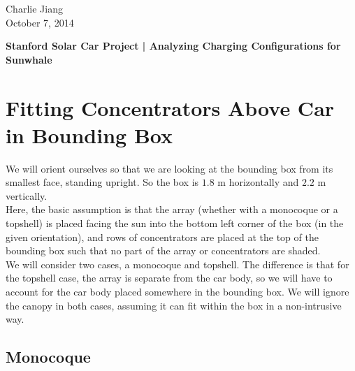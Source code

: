 \documentclass[reqno, 11pt, final]{article}
\begin{document}
\begin{flushright}
Charlie Jiang \\
October 7, 2014
\\[12pt]
\end{flushright}

\textbf{Stanford Solar Car Project | Analyzing Charging Configurations for Sunwhale} \\
\renewcommand{\baselinestretch}{1.1} %

\section{Fitting Concentrators Above Car in Bounding Box}

We will orient ourselves so that we are looking at the bounding box from its smallest face, standing upright. So the box is $1.8$ m horizontally and $2.2$ m vertically. \\

Here, the basic assumption is that the array (whether with a monocoque or a topshell) is placed facing the sun into the bottom left corner of the box (in the given orientation), and rows of concentrators are placed at the top of the bounding box such that no part of the array or concentrators are shaded. \\

We will consider two cases, a monocoque and topshell. The difference is that for the topshell case, the array is separate from the car body, so we will have to account for the car body placed somewhere in the bounding box. We will ignore the canopy in both cases, assuming it can fit within the box in a non-intrusive way.

\subsection{Monocoque}
\end{document}
